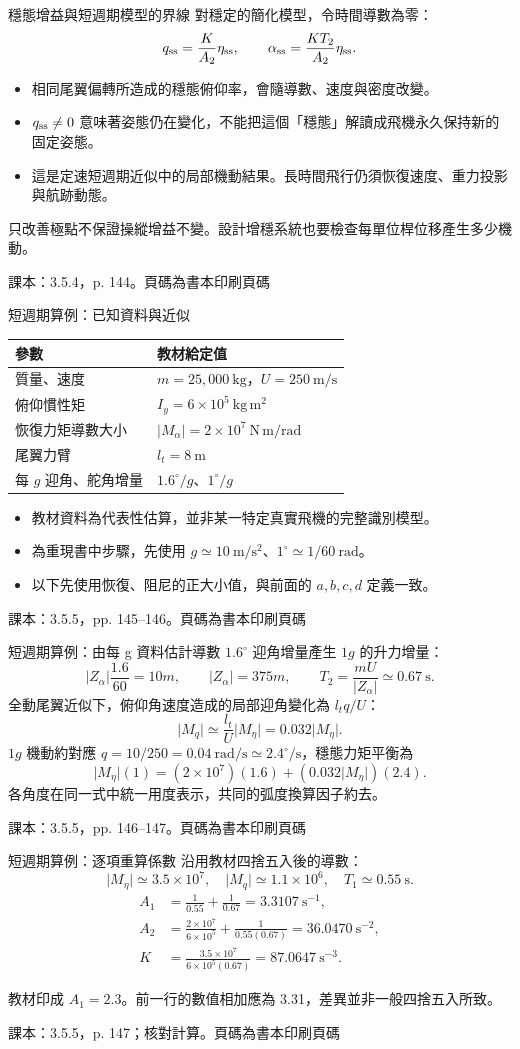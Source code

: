 \documentclass[aspectratio=169,11pt]{beamer}
\newcommand{\src}[1]{\par\vfill{\scriptsize\color{teal}#1}}
\newcommand{\slide}[3]{\begin{frame}[t]{#1}#3\src{#2}\end{frame}}
\newcommand{\bi}{\begin{itemize}\setlength{\itemsep}{5pt}}
\newcommand{\ei}{\end{itemize}}
\newcommand{\key}[1]{\par\medskip{\color{teal}\bfseries #1}\par\smallskip}
\newcommand{\bookslide}[3]{\slide{#1}{課本：#2。頁碼為書本印刷頁碼}{#3}}
\begin{document}
\bookslide{穩態增益與短週期模型的界線}{3.5.4，p. 144}{
對穩定的簡化模型，令時間導數為零：
\[q_{\rm ss}=\frac{K}{A_2}\eta_{\rm ss},\qquad
\alpha_{\rm ss}=\frac{KT_2}{A_2}\eta_{\rm ss}.\]
\bi
\item 相同尾翼偏轉所造成的穩態俯仰率，會隨導數、速度與密度改變。
\item $q_{\rm ss}\ne0$ 意味著姿態仍在變化，不能把這個「穩態」解讀成飛機永久保持新的固定姿態。
\item 這是定速短週期近似中的局部機動結果。長時間飛行仍須恢復速度、重力投影與航跡動態。
\ei
\key{控制連結}只改善極點不保證操縱增益不變。設計增穩系統也要檢查每單位桿位移產生多少機動。
}
\bookslide{短週期算例：已知資料與近似}{3.5.5，pp. 145--146}{
\small
\begin{tabular}{ll}
\toprule 參數 & 教材給定值\\\midrule
質量、速度 & $m=25{,}000\ \mathrm{kg}$，$U=250\ \mathrm{m/s}$\\
俯仰慣性矩 & $I_y=6\times10^5\ \mathrm{kg\,m^2}$\\
恢復力矩導數大小 & $\lvert M_\alpha\rvert=2\times10^7\ \mathrm{N\,m/rad}$\\
尾翼力臂 & $l_t=8\ \mathrm{m}$\\
每 $g$ 迎角、舵角增量 & $1.6^\circ/g$、$1^\circ/g$\\\bottomrule
\end{tabular}
\bi
\item 教材資料為代表性估算，並非某一特定真實飛機的完整識別模型。
\item 為重現書中步驟，先使用 $g\simeq10\ \mathrm{m/s^2}$、$1^\circ\simeq1/60\ \mathrm{rad}$。
\item 以下先使用恢復、阻尼的正大小值，與前面的 $a,b,c,d$ 定義一致。
\ei
}
\bookslide{短週期算例：由每 g 資料估計導數}{3.5.5，pp. 146--147}{
\small
$1.6^\circ$ 迎角增量產生 $1g$ 的升力增量：
\[\lvert Z_\alpha\rvert\frac{1.6}{60}=10m,\qquad
\lvert Z_\alpha\rvert=375m,\qquad
T_2=\frac{mU}{\lvert Z_\alpha\rvert}\simeq0.67\ \mathrm{s}.\]
全動尾翼近似下，俯仰角速度造成的局部迎角變化為 $l_tq/U$：
\[\lvert M_q\rvert\simeq\frac{l_t}{U}\lvert M_\eta\rvert
=0.032\lvert M_\eta\rvert.\]
$1g$ 機動約對應 $q=10/250=0.04\ \mathrm{rad/s}\simeq2.4^\circ/\mathrm{s}$，穩態力矩平衡為
\[\lvert M_\eta\rvert(1)
=(2\times10^7)(1.6)+(0.032\lvert M_\eta\rvert)(2.4).\]
各角度在同一式中統一用度表示，共同的弧度換算因子約去。
}
\bookslide{短週期算例：逐項重算係數}{3.5.5，p. 147；核對計算}{
\small
沿用教材四捨五入後的導數：
\[\lvert M_\eta\rvert\simeq3.5\times10^7,\quad
\lvert M_q\rvert\simeq1.1\times10^6,\quad T_1\simeq0.55\ \mathrm{s}.\]
\[\begin{aligned}
A_1&=\frac1{0.55}+\frac1{0.67}=\boxed{3.3107\ \mathrm{s^{-1}}},\\
A_2&=\frac{2\times10^7}{6\times10^5}+\frac1{0.55(0.67)}
=\boxed{36.0470\ \mathrm{s^{-2}}},\\
K&=\frac{3.5\times10^7}{6\times10^5(0.67)}=\boxed{87.0647\ \mathrm{s^{-3}}}.
\end{aligned}\]
\key{已確認的算術問題}教材印成 $A_1=2.3$。前一行的數值相加應為 3.31，差異並非一般四捨五入所致。
}
\end{document}
